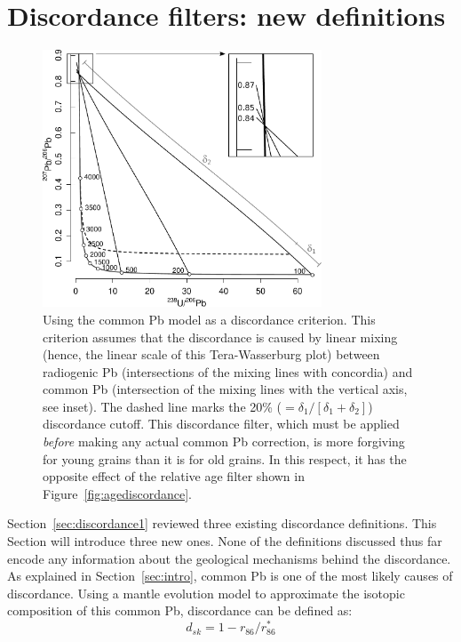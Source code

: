 \documentclass[gchron, manuscript]{copernicus}
\begin{document}
\section{Discordance filters: new definitions}\label{sec:discordance2}

\begin{figure}[t]
  \includegraphics[width=8.3cm]{TW-sk.pdf}
    \caption{Using the \citet{stacey1975} common Pb model as a
      discordance criterion. This criterion assumes that the
      discordance is caused by linear mixing (hence, the linear scale
      of this Tera-Wasserburg plot) between radiogenic Pb
      (intersections of the mixing lines with concordia) and common Pb
      (intersection of the mixing lines with the vertical axis, see
      inset). The dashed line marks the 20\% ($=
      \delta_1/[\delta_1+\delta_2]$) discordance cutoff. This
      discordance filter, which must be applied \emph{before} making
      any actual common Pb correction, is more forgiving for young
      grains than it is for old grains. In this respect, it has the
      opposite effect of the relative age filter shown in
      Figure~\ref{fig:agediscordance}.  }
    \label{fig:SK}
\end{figure}

Section~\ref{sec:discordance1} reviewed three existing discordance
definitions.  This Section will introduce three new ones.  None of the
definitions discussed thus far encode any information about the
geological mechanisms behind the discordance. As explained in
Section~\ref{sec:intro}, common Pb is one of the most likely causes of
discordance. Using a mantle evolution model \citep[e.g.][]{stacey1975}
to approximate the isotopic composition of this common Pb, discordance
can be defined as:
\begin{equation}
  d_{sk} = 1 - r_{86}/r_{86}^\ast
  \label{eq:dsk}
\end{equation}
\end{document}
